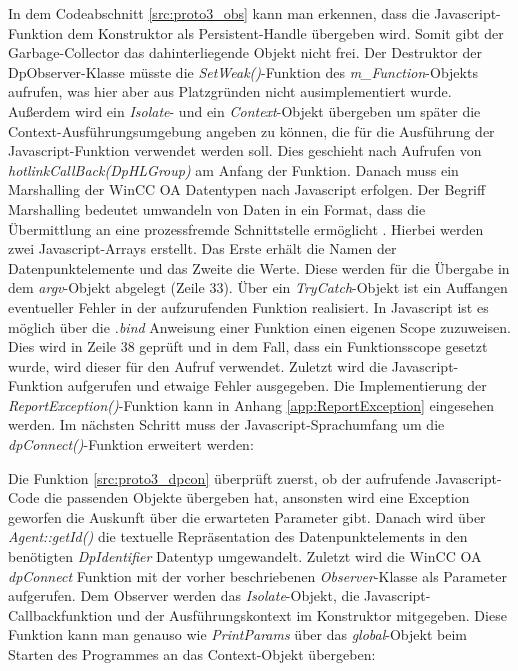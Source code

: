 In dem Codeabschnitt \ref{src:proto3_obs} kann man erkennen, dass die Javascript-Funktion dem Konstruktor als Persistent-Handle übergeben wird. Somit
gibt der Garbage-Collector das dahinterliegende Objekt nicht frei. Der Destruktor der DpObserver-Klasse müsste die \textit{SetWeak()}-Funktion des \textit{m\_Function}-Objekts aufrufen, was hier aber aus Platzgründen nicht ausimplementiert wurde.
Außerdem wird ein \textit{Isolate}- und ein \textit{Context}-Objekt übergeben um später die Context-Ausführungsumgebung angeben zu können, die für die Ausführung der Javascript-Funktion verwendet werden soll. 
Dies geschieht nach Aufrufen von \textit{hotlinkCallBack(DpHLGroup)} am Anfang der Funktion. Danach muss ein Marshalling der WinCC OA Datentypen nach Javascript erfolgen. 
Der Begriff Marshalling bedeutet umwandeln von Daten in ein Format, dass die Übermittlung an eine prozessfremde Schnittstelle ermöglicht \cite{marshalling}.
Hierbei werden zwei Javascript-Arrays erstellt. Das Erste erhält die Namen der Datenpunktelemente und das Zweite die Werte. Diese werden für die Übergabe
in dem \textit{argv}-Objekt abgelegt (Zeile 33). Über ein \textit{TryCatch}-Objekt ist ein Auffangen eventueller Fehler in der aufzurufenden Funktion realisiert. 
In Javascript ist es möglich über die \textit{.bind} Anweisung einer Funktion einen eigenen Scope zuzuweisen. Dies wird in Zeile 38 geprüft und in dem Fall, dass
ein Funktionsscope gesetzt wurde, wird dieser für den Aufruf verwendet.
Zuletzt wird die Javascript-Funktion aufgerufen und etwaige Fehler ausgegeben. Die Implementierung der \textit{ReportException()}-Funktion kann in Anhang \ref{app:ReportException}
eingesehen werden. Im nächsten Schritt muss der Javascript-Sprachumfang um die \textit{dpConnect()}-Funktion erweitert werden:




Die Funktion \ref{src:proto3_dpcon} überprüft zuerst, ob der aufrufende Javascript-Code die passenden Objekte übergeben hat, ansonsten
wird eine Exception geworfen die Auskunft über die erwarteten Parameter gibt. Danach wird über \textit{Agent::getId()} die textuelle Repräsentation 
des Datenpunktelements in den benötigten \textit{DpIdentifier} Datentyp umgewandelt. Zuletzt wird die WinCC OA \textit{dpConnect}
Funktion mit der vorher beschriebenen \textit{Observer}-Klasse als Parameter aufgerufen. Dem Observer werden das \textit{Isolate}-Objekt, die Javascript-Callbackfunktion und
der Ausführungskontext im Konstruktor mitgegeben. Diese Funktion kann man genauso wie \textit{PrintParams} über das \textit{global}-Objekt 
beim Starten des Programmes an das Context-Objekt übergeben:

